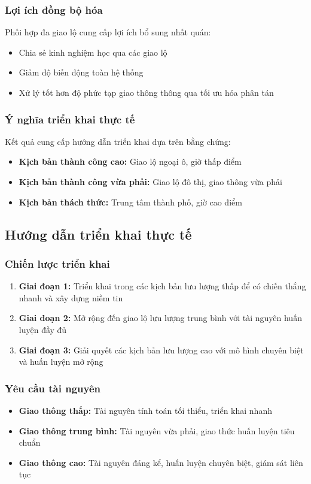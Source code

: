 \subsubsection{Lợi ích đồng bộ hóa}
Phối hợp đa giao lộ cung cấp lợi ích bổ sung nhất quán:
\begin{itemize}
    \item Chia sẻ kinh nghiệm học qua các giao lộ
    \item Giảm độ biến động toàn hệ thống
    \item Xử lý tốt hơn độ phức tạp giao thông thông qua tối ưu hóa phân tán
\end{itemize}

\subsubsection{Ý nghĩa triển khai thực tế}
Kết quả cung cấp hướng dẫn triển khai dựa trên bằng chứng:
\begin{itemize}
    \item \textbf{Kịch bản thành công cao:} Giao lộ ngoại ô, giờ thấp điểm
    \item \textbf{Kịch bản thành công vừa phải:} Giao lộ đô thị, giao thông vừa phải
    \item \textbf{Kịch bản thách thức:} Trung tâm thành phố, giờ cao điểm
\end{itemize}

\subsection{Hướng dẫn triển khai thực tế}

\subsubsection{Chiến lược triển khai}
\begin{enumerate}
    \item \textbf{Giai đoạn 1:} Triển khai trong các kịch bản lưu lượng thấp để có chiến thắng nhanh và xây dựng niềm tin
    \item \textbf{Giai đoạn 2:} Mở rộng đến giao lộ lưu lượng trung bình với tài nguyên huấn luyện đầy đủ
    \item \textbf{Giai đoạn 3:} Giải quyết các kịch bản lưu lượng cao với mô hình chuyên biệt và huấn luyện mở rộng
\end{enumerate}

\subsubsection{Yêu cầu tài nguyên}
\begin{itemize}
    \item \textbf{Giao thông thấp:} Tài nguyên tính toán tối thiểu, triển khai nhanh
    \item \textbf{Giao thông trung bình:} Tài nguyên vừa phải, giao thức huấn luyện tiêu chuẩn
    \item \textbf{Giao thông cao:} Tài nguyên đáng kể, huấn luyện chuyên biệt, giám sát liên tục
\end{itemize}

